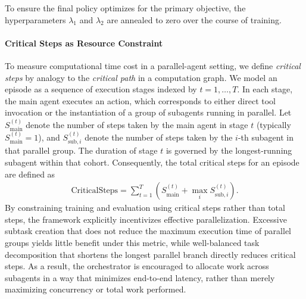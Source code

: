 To ensure the final policy optimizes for the primary objective, the hyperparameters $\lambda_1$ and $\lambda_2$ are annealed to zero over the course of training.




\paragraph{Critical Steps as Resource Constraint} 
To measure computational time cost in a parallel-agent setting, we define \emph{critical steps} by analogy to the \emph{critical path} in a computation graph. 
We model an episode as a sequence of execution stages indexed by $t = 1, \dots, T$. 
In each stage, the main agent executes an action, which corresponds to either direct tool invocation or the instantiation of a group of subagents running in parallel. Let $S_{\mathrm{main}}^{(t)}$ denote the number of steps taken by the main agent in stage $t$ (typically $S_{\mathrm{main}}^{(t)} = 1$), and  $S_{\mathrm{sub},i}^{(t)}$ denote the number of steps taken by the $i$-th subagent in that parallel group. 
The duration of stage $t$ is governed by the longest-running subagent within that cohort. Consequently, the total critical steps for an episode are defined as 
\begin{align*}
\text{CriticalSteps}
= \sum_{t=1}^{T} \left( S_{\mathrm{main}}^{(t)} + \max_i S_{\mathrm{sub}, i}^{(t)} \right).
\end{align*}
By constraining training and evaluation using critical steps rather than total steps, the framework explicitly incentivizes effective parallelization. Excessive subtask creation that does not reduce the maximum execution time of parallel groups yields little benefit under this metric, while well-balanced task decomposition that shortens the longest parallel branch directly reduces critical steps. As a result, the orchestrator is encouraged to allocate work across subagents in a way that minimizes end-to-end latency, rather than merely maximizing concurrency or total work performed.


